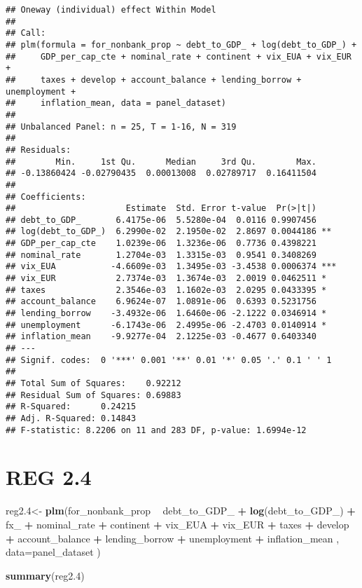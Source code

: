 \documentclass[]{article}
\newenvironment{Shaded}{\begin{snugshade}}{\end{snugshade}}
\newcommand{\KeywordTok}[1]{\textcolor[rgb]{0.13,0.29,0.53}{\textbf{#1}}}
\newcommand{\DataTypeTok}[1]{\textcolor[rgb]{0.13,0.29,0.53}{#1}}
\newcommand{\DecValTok}[1]{\textcolor[rgb]{0.00,0.00,0.81}{#1}}
\newcommand{\StringTok}[1]{\textcolor[rgb]{0.31,0.60,0.02}{#1}}
\newcommand{\OperatorTok}[1]{\textcolor[rgb]{0.81,0.36,0.00}{\textbf{#1}}}
\newcommand{\NormalTok}[1]{#1}
\begin{document}
\begin{verbatim}
## Oneway (individual) effect Within Model
## 
## Call:
## plm(formula = for_nonbank_prop ~ debt_to_GDP_ + log(debt_to_GDP_) + 
##     GDP_per_cap_cte + nominal_rate + continent + vix_EUA + vix_EUR + 
##     taxes + develop + account_balance + lending_borrow + unemployment + 
##     inflation_mean, data = panel_dataset)
## 
## Unbalanced Panel: n = 25, T = 1-16, N = 319
## 
## Residuals:
##        Min.     1st Qu.      Median     3rd Qu.        Max. 
## -0.13860424 -0.02790435  0.00013008  0.02789717  0.16411504 
## 
## Coefficients:
##                      Estimate  Std. Error t-value  Pr(>|t|)    
## debt_to_GDP_       6.4175e-06  5.5280e-04  0.0116 0.9907456    
## log(debt_to_GDP_)  6.2990e-02  2.1950e-02  2.8697 0.0044186 ** 
## GDP_per_cap_cte    1.0239e-06  1.3236e-06  0.7736 0.4398221    
## nominal_rate       1.2704e-03  1.3315e-03  0.9541 0.3408269    
## vix_EUA           -4.6609e-03  1.3495e-03 -3.4538 0.0006374 ***
## vix_EUR            2.7374e-03  1.3674e-03  2.0019 0.0462511 *  
## taxes              2.3546e-03  1.1602e-03  2.0295 0.0433395 *  
## account_balance    6.9624e-07  1.0891e-06  0.6393 0.5231756    
## lending_borrow    -3.4932e-06  1.6460e-06 -2.1222 0.0346914 *  
## unemployment      -6.1743e-06  2.4995e-06 -2.4703 0.0140914 *  
## inflation_mean    -9.9277e-04  2.1225e-03 -0.4677 0.6403340    
## ---
## Signif. codes:  0 '***' 0.001 '**' 0.01 '*' 0.05 '.' 0.1 ' ' 1
## 
## Total Sum of Squares:    0.92212
## Residual Sum of Squares: 0.69883
## R-Squared:      0.24215
## Adj. R-Squared: 0.14843
## F-statistic: 8.2206 on 11 and 283 DF, p-value: 1.6994e-12
\end{verbatim}

\section{REG 2.4}\label{reg-2.4}

\begin{Shaded}
\begin{Highlighting}[]
\NormalTok{reg2.}\DecValTok{4}\NormalTok{<-}\StringTok{ }\KeywordTok{plm}\NormalTok{(for_nonbank_prop }\OperatorTok{~}\StringTok{  }\NormalTok{debt_to_GDP_ }\OperatorTok{+}\StringTok{ }\KeywordTok{log}\NormalTok{(debt_to_GDP_) }\OperatorTok{+}\StringTok{ }\NormalTok{fx_ }\OperatorTok{+}\StringTok{   }\NormalTok{nominal_rate }\OperatorTok{+}\StringTok{ }\NormalTok{continent }\OperatorTok{+}\StringTok{ }\NormalTok{vix_EUA }\OperatorTok{+}\StringTok{ }\NormalTok{vix_EUR }\OperatorTok{+}\StringTok{ }\NormalTok{taxes }\OperatorTok{+}\StringTok{ }\NormalTok{develop }\OperatorTok{+}\StringTok{ }\NormalTok{account_balance }\OperatorTok{+}\StringTok{ }\NormalTok{lending_borrow }\OperatorTok{+}\StringTok{ }\NormalTok{unemployment }\OperatorTok{+}\StringTok{ }\NormalTok{inflation_mean , }\DataTypeTok{data=}\NormalTok{panel_dataset  )}

\KeywordTok{summary}\NormalTok{(reg2.}\DecValTok{4}\NormalTok{)}
\end{Highlighting}
\end{Shaded}
\end{document}

